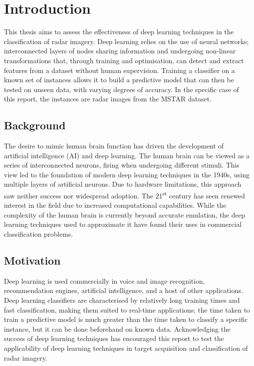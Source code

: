 \chapter{Introduction}
This thesis aims to assess the effectiveness of deep learning techniques in the classification of radar imagery. Deep learning relies on the use of neural networks; interconnected layers of nodes sharing information and undergoing non-linear transformations that, through training and optimisation, can detect and extract features from a dataset without human supervision. Training a classifier on a known set of instances allows it to build a predictive model that can then be tested on unseen data, with varying degrees of accuracy. In the specific case of this report, the instances are radar images from the MSTAR dataset.

\section{Background}
The desire to mimic human brain function has driven the development of artificial intelligence (AI) and deep learning. The human brain can be viewed as a series of interconnected neurons, firing when undergoing different stimuli. This view led to the foundation of modern deep learning techniques in the 1940s, using multiple layers of artificial neurons. Due to hardware limitations, this approach saw neither success nor widespread adoption. The 21\textsuperscript{st} century has seen renewed interest in the field due to increased computational capabilities. While the complexity of the human brain is currently beyond accurate emulation, the deep learning techniques used to approximate it have found their uses in commercial classification problems.

\section{Motivation}

Deep learning is used commercially in voice and image recognition, recommendation engines, artificial intelligence, and a host of other applications. Deep learning classifiers are characterised by relatively long training times and fast classification, making them suited to real-time applications; the time taken to train a predictive model is much greater than the time taken to classify a specific instance, but it can be done beforehand on known data. Acknowledging the success of deep learning techniques has encouraged this report to test the applicability of deep learning techniques in target acquisition and classification of radar imagery.  



